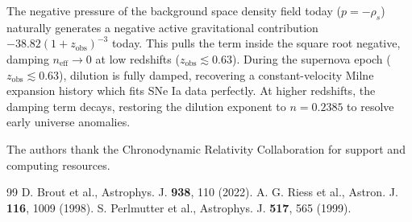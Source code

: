 \documentclass[reprint,aps,prd,twocolumn,superscriptaddress,nofootinbib,amsmath,amssymb]{revtex4-2}
\begin{document}
The negative pressure of the background space density field today ($p = -\rho_s$) naturally generates a negative active gravitational contribution $-38.82 (1+z_{\text{obs}})^{-3}$ today. This pulls the term inside the square root negative, damping $n_{\text{eff}} \rightarrow 0$ at low redshifts ($z_{\text{obs}} \lesssim 0.63$). 
During the supernova epoch ($z_{\text{obs}} \lesssim 0.63$), dilution is fully damped, recovering a constant-velocity Milne expansion history which fits SNe Ia data perfectly. At higher redshifts, the damping term decays, restoring the dilution exponent to $n=0.2385$ to resolve early universe anomalies.

\begin{acknowledgements}
The authors thank the Chronodynamic Relativity Collaboration for support and computing resources.
\end{acknowledgements}

\begin{thebibliography}{99}
 D. Brout et al., Astrophys. J. \textbf{938}, 110 (2022).
 A. G. Riess et al., Astron. J. \textbf{116}, 1009 (1998).
 S. Perlmutter et al., Astrophys. J. \textbf{517}, 565 (1999).
\end{thebibliography}
\end{document}
